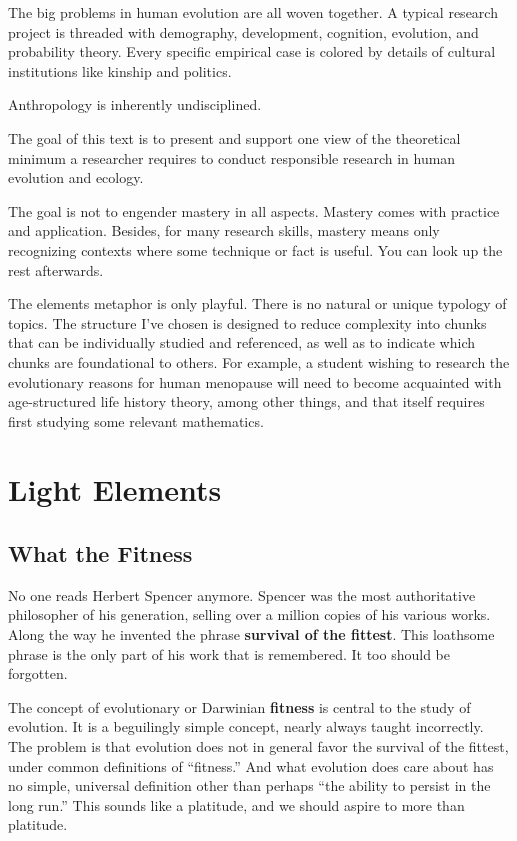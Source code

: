 \documentclass[10pt,reqno]{amsbook}
\newcommand{\bemph}[1]{{\textbf{\textcolor{bemphcol}{#1}}}}
\numberwithin{equation}{chapter}
\begin{document}
The big problems in human evolution are all woven together. A typical research project is threaded with demography, development, cognition, evolution, and probability theory. Every specific empirical case is colored by details of cultural institutions like kinship and politics. 

Anthropology is inherently undisciplined. 

The goal of this text is to present and support one view of the theoretical minimum a researcher requires to conduct responsible research in human evolution and ecology.

The goal is not to engender mastery in all aspects. Mastery comes with practice and application. Besides, for many research skills, mastery means only recognizing contexts where some technique or fact is useful. You can look up the rest afterwards.  

The elements metaphor is only playful. There is no natural or unique typology of topics. The structure I've chosen is designed to reduce complexity into chunks that can be individually studied and referenced, as well as to indicate which chunks are foundational to others. For example, a student wishing to research the evolutionary reasons for human menopause will need to become acquainted with age-structured life history theory, among other things, and that itself requires first studying some relevant mathematics. 

\mainmatter

\linenumbers
\modulolinenumbers[5]


\part{Light Elements}


\def \chapterElement {F}
\chapter{What the Fitness}\label{link1F}

No one reads Herbert Spencer anymore. Spencer was the most authoritative philosopher of his generation, selling over a million copies of his various works. Along the way he invented the phrase \bemph{survival of the fittest}. This loathsome phrase is the only part of his work that is remembered. It too should be forgotten.

The concept of evolutionary or Darwinian \bemph{fitness} is central to the study of evolution. It is a beguilingly simple concept, nearly always taught incorrectly. The problem is that evolution does not in general favor the survival of the fittest, under common definitions of ``fitness.'' And what evolution does care about has no simple, universal definition other than perhaps ``the ability to persist in the long run.'' This sounds like a platitude, and we should aspire to more than platitude. 
\end{document}
